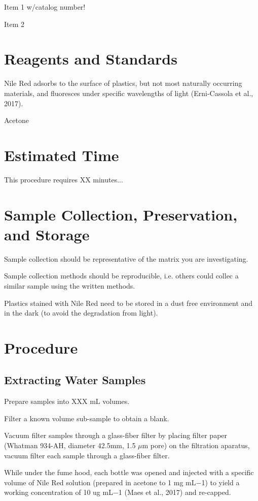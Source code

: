 \documentclass[12pt]{../SOP4_alpha}\usepackage[]{graphicx}\usepackage[]{color}
\begin{document}
\NP Item 1 w/catalog number!

\NP Item 2

\section{Reagents and Standards}

\NP Nile Red adsorbs to the surface of plastics, but not most naturally occurring materials, and fluoresces under specific wavelengths of light (Erni-Cassola et al., 2017). 

\NP Acetone

\section{Estimated Time}

\NP This procedure requires XX minutes...

\section{Sample Collection, Preservation, and Storage}

\NP Sample collection should be representative of the matrix you are investigating. 

\NP Sample collection methods should be reproducible, i.e. others could collec a similar sample using the written methods. 

\NP Plastics stained with Nile Red need to be stored in a dust free environment and in the dark (to avoid the degradation from light).

\section{Procedure}

\subsection{Extracting Water Samples}

\NP Prepare samples into XXX mL volumes. 

\NP Filter a known volume sub-sample to obtain a blank.

\NP Vacuum filter samples through a glass-fiber filter by placing filter paper (Whatman 934-AH, diameter 42.5mm, 1.5 $\mu$m pore) on the filtration aparatus, vacuum filter each sample through a glass-fiber filter.

\NP While under the fume hood, each bottle was opened and injected with a specific volume of Nile Red solution (prepared in acetone to 1 mg mL−1) to yield a working concentration of 10 ug mL−1 (Maes et al., 2017) and re-capped. 
\end{document}
